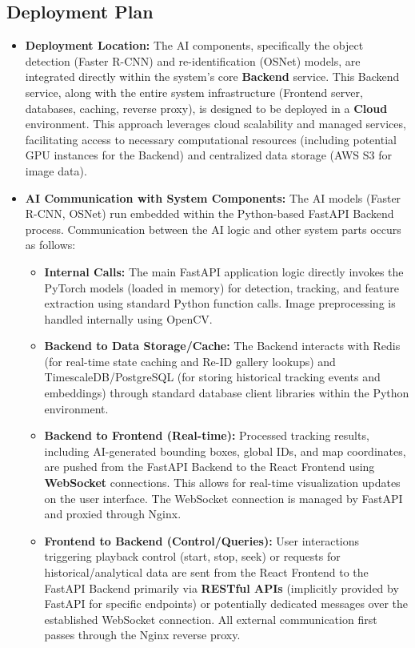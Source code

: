 \subsection{Deployment Plan}
\label{subsection:deployment-plan}

\begin{itemize}
    \item \textbf{Deployment Location:}
        The AI components, specifically the object detection (Faster R-CNN) and re-identification (OSNet) models, are integrated directly within the system's core \textbf{Backend} service. This Backend service, along with the entire system infrastructure (Frontend server, databases, caching, reverse proxy), is designed to be deployed in a \textbf{Cloud} environment. This approach leverages cloud scalability and managed services, facilitating access to necessary computational resources (including potential GPU instances for the Backend) and centralized data storage (AWS S3 for image data).

    \item \textbf{AI Communication with System Components:}
        The AI models (Faster R-CNN, OSNet) run embedded within the Python-based FastAPI Backend process. Communication between the AI logic and other system parts occurs as follows:
        \begin{itemize}
            \item \textbf{Internal Calls:} The main FastAPI application logic directly invokes the PyTorch models (loaded in memory) for detection, tracking, and feature extraction using standard Python function calls. Image preprocessing is handled internally using OpenCV.
            \item \textbf{Backend to Data Storage/Cache:} The Backend interacts with Redis (for real-time state caching and Re-ID gallery lookups) and TimescaleDB/PostgreSQL (for storing historical tracking events and embeddings) through standard database client libraries within the Python environment.
            \item \textbf{Backend to Frontend (Real-time):} Processed tracking results, including AI-generated bounding boxes, global IDs, and map coordinates, are pushed from the FastAPI Backend to the React Frontend using \textbf{WebSocket} connections. This allows for real-time visualization updates on the user interface. The WebSocket connection is managed by FastAPI and proxied through Nginx.
            \item \textbf{Frontend to Backend (Control/Queries):} User interactions triggering playback control (start, stop, seek) or requests for historical/analytical data are sent from the React Frontend to the FastAPI Backend primarily via \textbf{RESTful APIs} (implicitly provided by FastAPI for specific endpoints) or potentially dedicated messages over the established WebSocket connection. All external communication first passes through the Nginx reverse proxy.
        \end{itemize}


\end{itemize}
